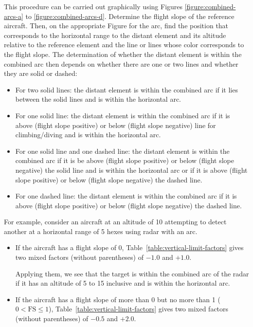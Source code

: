 {This procedure can be carried out graphically using Figures \ref{figure:combined-arcs-a} to \ref{figure:combined-arcs-d}. Determine the flight slope of the reference aircraft. Then, on the appropriate Figure for the arc, find the position that corresponds to the horizontal range to the distant element and its altitude relative to the reference element and the line or lines whose color corresponds to the flight slope. The determination of whether the distant element is within the combined arc then depends on whether there are one or two lines and whether they are solid or dashed:

\begin{itemize}
    \item For two solid lines: the distant element is within the combined arc if it lies between the solid lines and is within the horizontal arc.
    \item For one solid line: the distant element is within the combined arc if it is above (flight slope positive) or below (flight slope negative) line for climbing/diving and is within the horizontal arc.
    \item For one solid line and one dashed line: the distant element is within the combined arc if it is be above (flight slope positive) or below (flight slope negative) the solid line and is within the horizontal arc or if it is above (flight slope positive) or below (flight slope negative) the dashed line.
    \item For one dashed line: the distant element is within the combined arc if it is above (flight slope positive) or below (flight slope negative) the dashed line.
\end{itemize}

For example, consider an aircraft at an altitude of 10 attempting to detect another at a horizontal range of 5 hexes using radar with an  arc.
\begin{itemize}
\item
If the aircraft has a flight slope of 0, Table~\ref{table:vertical-limit-factors} gives two mixed factors (without parentheses) of $-1.0$ and $+1.0$. 

Applying them, we see that the target is within the combined arc of the radar if it has an altitude of 5 to 15 inclusive and is within the  horizontal arc.

\item
If the aircraft has a flight slope of more than 0 but no more than 1 ($0 < \mbox{FS} \le 1$), Table~\ref{table:vertical-limit-factors} gives two mixed factors (without parentheses) of $-0.5$ and $+2.0$. 


\end{itemize}}
